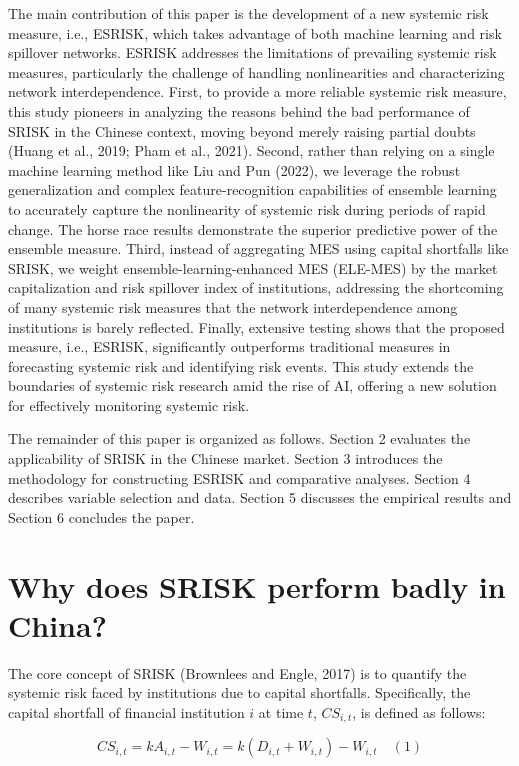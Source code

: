 \documentclass[12pt,a4paper]{article}
\begin{document}
    The main contribution of this paper is the development of a new systemic risk measure, i.e., ESRISK, which takes advantage of both machine learning and risk spillover networks. ESRISK addresses the limitations of prevailing systemic risk measures, particularly the challenge of handling nonlinearities and characterizing network interdependence. First, to provide a more reliable systemic risk measure, this study pioneers in analyzing the reasons behind the bad performance of SRISK in the Chinese context, moving beyond merely raising partial doubts (Huang et al., 2019; Pham et al., 2021). Second, rather than relying on a single machine learning method like Liu and Pun (2022), we leverage the robust generalization and complex feature-recognition capabilities of ensemble learning to accurately capture the nonlinearity of systemic risk during periods of rapid change. The horse race results demonstrate the superior predictive power of the ensemble measure. Third, instead of aggregating MES using capital shortfalls like SRISK, we weight ensemble-learning-enhanced MES (ELE-MES) by the market capitalization and risk spillover index of institutions, addressing the shortcoming of many systemic risk measures that the network interdependence among institutions is barely reflected. Finally, extensive testing shows that the proposed measure, i.e., ESRISK, significantly outperforms traditional measures in forecasting systemic risk and identifying risk events. This study extends the boundaries of systemic risk research amid the rise of AI, offering a new solution for effectively monitoring systemic risk.

    The remainder of this paper is organized as follows. Section 2 evaluates the applicability of SRISK in the Chinese market. Section 3 introduces the methodology for constructing ESRISK and comparative analyses. Section 4 describes variable selection and data. Section 5 discusses the empirical results and Section 6 concludes the paper.

    \section{Why does SRISK perform badly in China?}

    The core concept of SRISK (Brownlees and Engle, 2017) is to quantify the systemic risk faced by institutions due to capital shortfalls. Specifically, the capital shortfall of financial institution $i$ at time $t$, $CS_{i,t}$, is defined as follows:

    \[
    CS_{i,t} = kA_{i,t} - W_{i,t} =  k(D_{i,t} + W_{i,t}) - W_{i,t} \quad (1)
    \]
\end{document}

